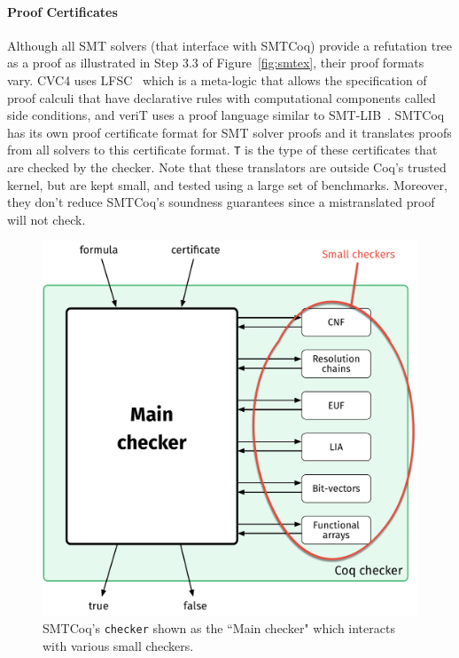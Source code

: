 \documentclass[11pt]{article}
\begin{document}
	\paragraph{Proof Certificates} Although all 
	SMT solvers (that 
	interface with SMTCoq) provide a
	refutation tree as a proof as 
	illustrated in Step 3.3 of 
	Figure~\ref{fig:smtex},
	their proof formats vary. CVC4 uses 
	LFSC~\cite{DBLP:journals/fmsd/StumpORHT13}
	which is a meta-logic that allows the 
	specification of proof calculi that have 
	declarative	rules with computational 
	components called side conditions, and 
	veriT uses a proof language similar to 
	SMT-LIB~\cite{Besson1}. SMTCoq has its 
	own proof certificate format for SMT 
	solver proofs and it translates proofs 
	from all solvers to this certificate 
	format. \texttt{T} is the type of 
	these certificates that are 
	checked by the checker. Note 
	that these translators are outside 
	Coq's trusted kernel, but are kept
	small, and tested using a large 
	set of benchmarks. Moreover, they
	don't reduce SMTCoq's soundness
	guarantees since a mistranslated
	proof will not check.
	
	\begin{figure}[t]
		\begin{center}
			\includegraphics[scale=0.3]{checker}
			\caption{SMTCoq's \texttt{checker}
				shown as the ``Main checker" which 
				interacts with various small checkers.}
			\label{fig:checker}
		\end{center}
	\end{figure}
	
\end{document}
